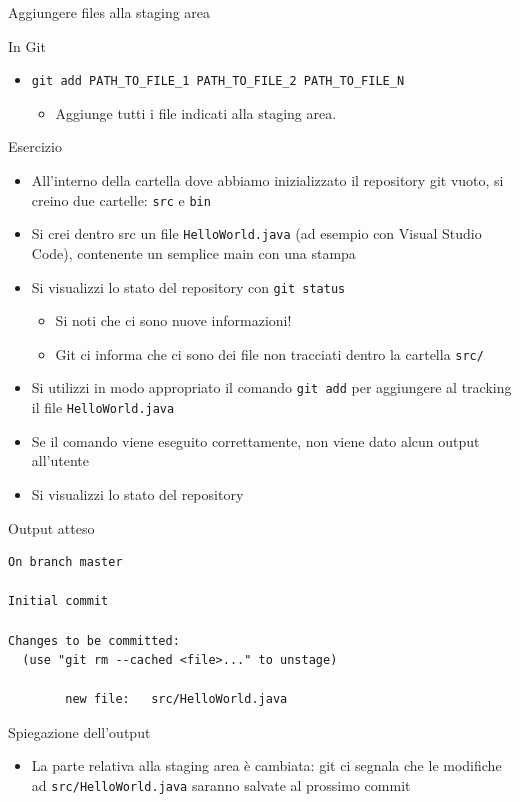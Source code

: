 \documentclass[xcolor=dvipsnames,presentation]{beamer}
\begin{document}
\begin{frame}{Aggiungere files alla staging area}
\begin{block}{In Git}
\begin{itemize}
\begin{itemize}
modificato, o cancellato)
				\item Il file può essere un file che esisteva ma è stato cancellato!
				\item In questo caso, viene registrata nella staging area la cancellazione
			\end{itemize}
			\item \texttt{git add PATH\_TO\_FILE\_1 PATH\_TO\_FILE\_2 PATH\_TO\_FILE\_N}
			\begin{itemize}
				\item Aggiunge tutti i file indicati alla staging area.
			\end{itemize}
		\end{itemize}
	\end{block}
	\begin{block}{Esercizio}
		\begin{itemize}
			\item All'interno della cartella dove abbiamo inizializzato il repository git vuoto, si
creino due cartelle: \texttt{src} e \texttt{bin}
			\item Si crei dentro src un file \texttt{HelloWorld.java} (ad esempio con Visual Studio Code), contenente un semplice main con una stampa
			\item Si visualizzi lo stato del repository con \texttt{git status}
			\begin{itemize}
				\item Si noti che ci sono nuove informazioni!
				\item Git ci informa che ci sono dei file non tracciati dentro la cartella
\texttt{src/}
			\end{itemize}
			\item Si utilizzi in modo appropriato il comando \texttt{git add} per aggiungere al
tracking il file \texttt{HelloWorld.java}
			\item Se il comando viene eseguito correttamente, non viene dato alcun output all'utente
			\item Si visualizzi lo stato del repository
		\end{itemize}
	\end{block}
	\begin{block}{Output atteso}
		\begin{Verbatim}[fontsize=\scriptsize]
On branch master

Initial commit

Changes to be committed:
  (use "git rm --cached <file>..." to unstage)

        new file:   src/HelloWorld.java
			\end{Verbatim}
	\end{block}
	\begin{block}{Spiegazione dell'output}
		\begin{itemize}
			\item La parte relativa alla staging area è cambiata: git ci segnala che le modifiche ad
\texttt{src/HelloWorld.java} saranno salvate al prossimo commit
		\end{itemize}
	\end{block}
\end{frame}
\end{document}
